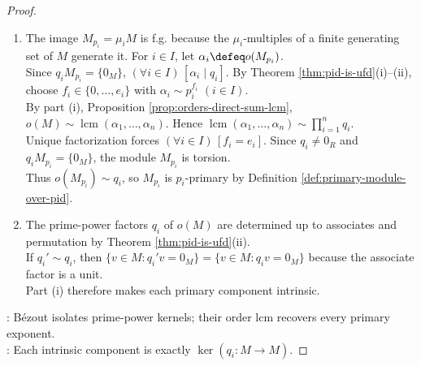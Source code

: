 \begin{theorem}
\begin{proof}
\begin{enumerate}[label=(\roman*)]
\begin{enumerate}[label=(\alph*)]
Thus $(\forall x\in M)\,[x=\sum\limits_{i=1}^na_i\mu_ix]$, so $M=\sum\limits_{i=1}^nM_{p_i}$.
\item {}: Since $q_i\mu_i=\mu$ and $\mu M=\{0_M\}$, $(\forall i\in I)\,[q_iM_{p_i}=\{0_M\}]$.\\
Fix $i\in I$ and $v\in M$ with $q_iv=0_M$. The elements $\mu_i$ and $q_i$ have no common nonunit divisor.\\
Choose $a,b\in R$ with $a\mu_i+bq_i=1_R$ by Theorem \ref{thm:pid-prime-irreducible-bezout}(iii).\\
Then $v=a\mu_iv+bq_iv=a\mu_iv\in M_{p_i}$. Hence $M_{p_i}=\{v\in M:q_iv=0_M\}$.
\item {}: Let $(x_i)_{i=1}^n\in\prod\limits_{i=1}^nM_{p_i}$ satisfy $\sum\limits_{i=1}^nx_i=0_M$, and fix $i\in I$.\\
If $j\neq i$, then $q_j\mid\mu_i$ and $q_jx_j=0_M$, so $\mu_ix_j=0_M$. By multiplying the displayed sum by $\mu_i$, $\mu_ix_i=0_M$.\\
Together with $q_ix_i=0_M$ and the Bézout identity for $\mu_i,q_i$, this implies $x_i=0_M$. Thus the sum is direct.
\end{enumerate}
\item The image $M_{p_i}=\mu_iM$ is f.g. because the $\mu_i$-multiples of a finite generating set of $M$ generate it. For $i\in I$, let $\alpha_i\defeq o(M_{p_i})$.\\
Since $q_iM_{p_i}=\{0_M\}$, $(\forall i\in I)\,[\alpha_i\mid q_i]$. By Theorem \ref{thm:pid-is-ufd}(i)--(ii), choose $f_i\in\{0,\ldots,e_i\}$ with $\alpha_i\sim p_i^{f_i}$ $(i\in I)$.\\
By part (i), Proposition \ref{prop:orders-direct-sum-lcm}, $o(M)\sim\operatorname{lcm}(\alpha_1,\ldots,\alpha_n)$. Hence $\operatorname{lcm}(\alpha_1,\ldots,\alpha_n)\sim\prod\limits_{i=1}^nq_i$.\\
Unique factorization forces $(\forall i\in I)\,[f_i=e_i]$. Since $q_i\neq0_R$ and $q_iM_{p_i}=\{0_M\}$, the module $M_{p_i}$ is torsion.\\
Thus $o(M_{p_i})\sim q_i$, so $M_{p_i}$ is $p_i$-primary by Definition \ref{def:primary-module-over-pid}.
\item The prime-power factors $q_i$ of $o(M)$ are determined up to associates and permutation by Theorem \ref{thm:pid-is-ufd}(ii).\\
If $q_i'\sim q_i$, then $\{v\in M:q_i'v=0_M\}=\{v\in M:q_iv=0_M\}$ because the associate factor is a unit.\\
Part (i) therefore makes each primary component intrinsic.
\end{enumerate}
\noindent
{}: Bézout isolates prime-power kernels; their order lcm recovers every primary exponent.\\
: Each intrinsic component is exactly $\ker(q_i:M\to M)$.
\end{proof}
\end{theorem}

